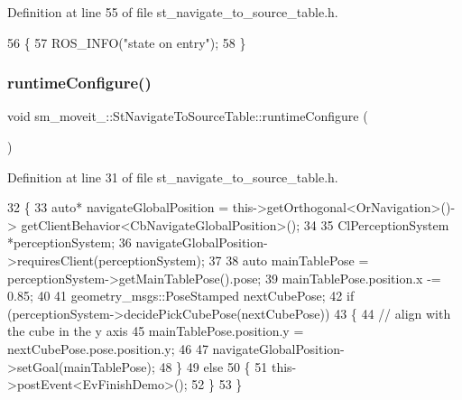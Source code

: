 Definition at line 55 of file st\+\_\+navigate\+\_\+to\+\_\+source\+\_\+table.\+h.


\begin{DoxyCode}
56         \{
57             ROS\_INFO(\textcolor{stringliteral}{"state on entry"});
58         \}
\end{DoxyCode}
\mbox{\label{structsm__moveit__4_1_1StNavigateToSourceTable_a532b64eb7ea6938d22c712e29ecf0ac9}} 
\subsubsection{\texorpdfstring{runtime\+Configure()}{runtimeConfigure()}}
{\footnotesize\ttfamily void sm\+\_\+moveit\+\_\+::\+St\+Navigate\+To\+Source\+Table\+::runtime\+Configure (\begin{DoxyParamCaption}{ }\end{DoxyParamCaption})\hspace{0.3cm}{\ttfamily [inline]}}



Definition at line 31 of file st\+\_\+navigate\+\_\+to\+\_\+source\+\_\+table.\+h.


\begin{DoxyCode}
32         \{
33             \textcolor{keyword}{auto}* navigateGlobalPosition = this->getOrthogonal<OrNavigation>()->
      getClientBehavior<CbNavigateGlobalPosition>();
34             
35             ClPerceptionSystem *perceptionSystem;
36             navigateGlobalPosition->requiresClient(perceptionSystem);
37 
38             \textcolor{keyword}{auto} mainTablePose = perceptionSystem->getMainTablePose().pose;
39             mainTablePose.position.x -= 0.85;
40 
41             geometry\_msgs::PoseStamped nextCubePose;
42             \textcolor{keywordflow}{if} (perceptionSystem->decidePickCubePose(nextCubePose))
43             \{
44                 \textcolor{comment}{// align with the cube in the y axis}
45                 mainTablePose.position.y = nextCubePose.pose.position.y;
46 
47                 navigateGlobalPosition->setGoal(mainTablePose);
48             \}
49             \textcolor{keywordflow}{else}
50             \{
51                 this->postEvent<EvFinishDemo>();
52             \}
53         \}
\end{DoxyCode}
\mbox{\label{structsm__moveit__4_1_1StNavigateToSourceTable_a10d9b17cf7d5450760c13552eb9de0b5}} 
